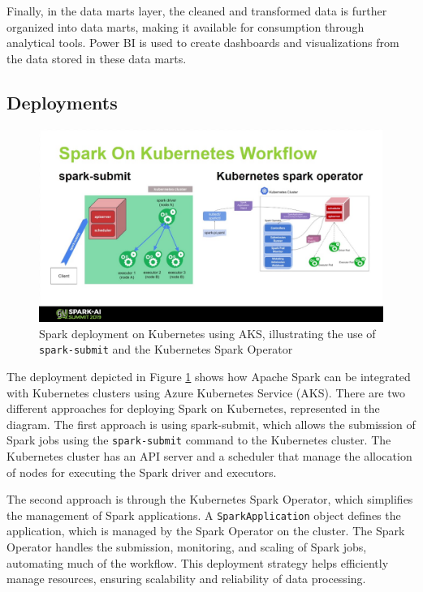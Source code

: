 \documentclass[12pt,a4paper]{article}
\begin{document}
Finally, in the data marts layer, the cleaned and transformed data is further
organized into data marts, making it available for consumption through
analytical tools. Power BI is used to create dashboards and visualizations from
the data stored in these data marts.

\subsection{Deployments}

\begin{figure}[h]
\centering
\includegraphics[width=\textwidth]{Images/sparkdevops.png}
\vspace{1em}
\caption{Spark deployment on Kubernetes using AKS, illustrating the use of
\texttt{spark-submit} and the Kubernetes Spark Operator
\cite{spark_ai_summit_2019}}
\label{fig:sparkdevops}
\end{figure}

The deployment depicted in Figure \ref{fig:sparkdevops} shows how Apache Spark
can be integrated with Kubernetes clusters using Azure Kubernetes Service (AKS).
There are two different approaches for deploying Spark on Kubernetes,
represented in the diagram. The first approach is using spark-submit, which
allows the submission of Spark jobs using the \texttt{spark-submit} command to
the Kubernetes cluster. The Kubernetes cluster has an API server and a scheduler
that manage the allocation of nodes for executing the Spark driver and
executors.

The second approach is through the Kubernetes Spark Operator, which simplifies
the management of Spark applications. A \texttt{SparkApplication} object defines
the application, which is managed by the Spark Operator on the cluster. The
Spark Operator handles the submission, monitoring, and scaling of Spark jobs,
automating much of the workflow. This deployment strategy helps efficiently
manage resources, ensuring scalability and reliability of data processing.
\end{document}
